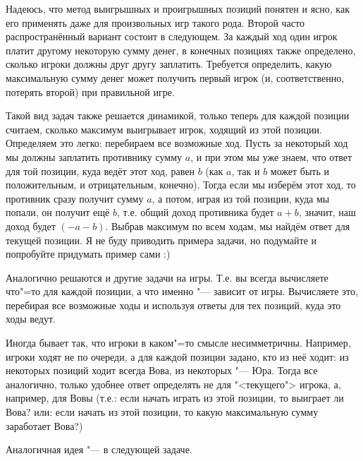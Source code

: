 Надеюсь, что метод выигрышных и проигрышных позиций понятен и ясно, как его применять даже для произвольных игр такого рода.
Второй часто распространённый вариант состоит в следующем. За каждый ход один игрок платит другому некоторую сумму денег,
в конечных позициях также определено, сколько игроки должны друг другу заплатить. Требуется определить, какую максимальную
сумму денег может получить первый игрок (и, соответственно, потерять второй) при правильной игре.

Такой вид задач также решается динамикой, только теперь для каждой позиции считаем, сколько максимум выигрывает
игрок, ходящий из этой позиции. Определяем это легко: перебираем все возможные ход. Пусть за некоторый ход мы 
должны заплатить противнику сумму $a$, и при этом мы уже знаем, что ответ для той позиции, куда ведёт этот ход,
равен $b$ (как $a$, так и $b$ может быть и положительным, и отрицательным, конечно). Тогда если мы изберём этот ход,
то противник сразу получит сумму $a$, а потом, играя из той позиции, куда мы попали, он получит ещё $b$, т.е.
общий доход противника будет $a+b$, значит, наш доход будет $(-a-b)$. Выбрав максимум по всем ходам, мы найдём ответ
для текущей позиции. Я не буду приводить примера задачи, но подумайте и попробуйте придумать пример сами :)

Аналогично решаются и другие задачи на игры. Т.е. вы всегда вычисляете что"=то для каждой позиции, а что именно "---
зависит от игры. Вычисляете это, перебирая все возможные ходы и используя ответы для тех позиций, куда это ходы ведут.

{\small {}}

Иногда бывает так, что игроки в каком"=то смысле несимметричны. Например, игроки ходят не по
очереди, а для каждой позиции задано, кто из неё ходит: из некоторых
позиций ходит всегда Вова, из некоторых "--- Юра. Тогда все аналогично, только удобнее ответ определять
не для "<текущего"> игрока, а, например, для Вовы (т.е.: если начать играть из этой позиции, то выиграет ли Вова? или:
если начать из этой позиции, то какую максимальную сумму заработает Вова?)

Аналогичная идея "--- в следующей задаче.

